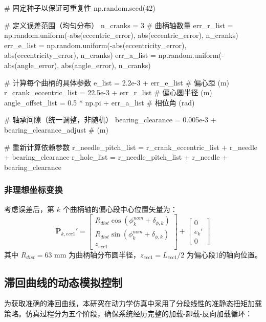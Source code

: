 \documentclass[12pt]{ctexart}
\begin{document}
\begin{pythoncode}[随机误差分配算法]
# 固定种子以保证可重复性
np.random.seed(42)

# 定义误差范围（均匀分布）
n_cranks = 3  # 曲柄轴数量
err_r_list = np.random.uniform(-abs(eccentric_error), abs(eccentric_error), n_cranks)
err_e_list = np.random.uniform(-abs(eccentricity_error), abs(eccentricity_error), n_cranks)
err_a_list = np.random.uniform(-abs(angle_error), abs(angle_error), n_cranks)

# 计算每个曲柄的具体参数
e_list = 2.2e-3 + err_e_list  # 偏心距 (m)
r_crank_eccentric_list = 22.5e-3 + err_r_list  # 偏心圆半径 (m)
angle_offset_list = 0.5 * np.pi + err_a_list  # 相位角 (rad)

# 轴承间隙（统一调整，非随机）
bearing_clearance = 0.005e-3 + bearing_clearance_adjust  # (m)

# 重新计算依赖参数
r_needle_pitch_list = r_crank_eccentric_list + r_needle + bearing_clearance
r_hole_list = r_needle_pitch_list + r_needle + bearing_clearance
\end{pythoncode}

\subsubsection{非理想坐标变换}
考虑误差后，第 $k$ 个曲柄轴的偏心段中心位置矢量为：
\begin{equation}
\mathbf{P}_{k,ecc1}' =
\begin{bmatrix}
R_{dist} \cos(\phi_k^{nom} + \delta_{\phi,k}) \\
R_{dist} \sin(\phi_k^{nom} + \delta_{\phi,k}) \\
z_{ecc1}
\end{bmatrix}
+
\begin{bmatrix}
0 \\
e_k' \\
0
\end{bmatrix}
\end{equation}
其中 $R_{dist} = 63$ mm 为曲柄轴分布圆半径，$z_{ecc1} = L_{ecc1}/2$ 为偏心段1的轴向位置。

\subsection{滞回曲线的动态模拟控制}
为获取准确的滞回曲线，本研究在动力学仿真中采用了分段线性的准静态扭矩加载策略。仿真过程分为五个阶段，确保系统经历完整的加载-卸载-反向加载循环：
\end{document}
